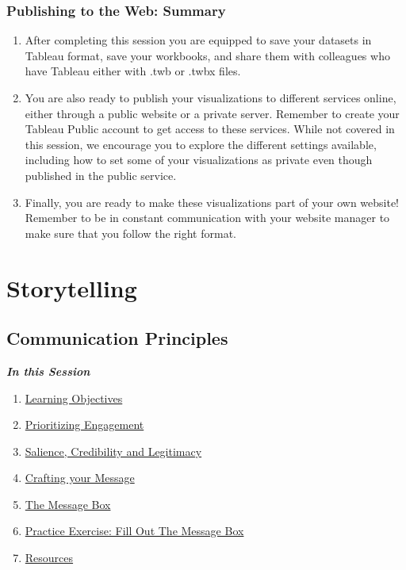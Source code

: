 \documentclass[
]{book}
\providecommand{\tightlist}{%
  \setlength{\itemsep}{0pt}\setlength{\parskip}{0pt}}
\begin{document}
\hypertarget{publishing-to-the-web-summary}{%
\subsection{Publishing to the Web: Summary}\label{publishing-to-the-web-summary}}

\begin{enumerate}
\def\labelenumi{\arabic{enumi}.}
\tightlist
\item
  After completing this session you are equipped to save your datasets in Tableau format, save your workbooks, and share them with colleagues who have Tableau either with .twb or .twbx files.
\item
  You are also ready to publish your visualizations to different services online, either through a public website or a private server. Remember to create your Tableau Public account to get access to these services. While not covered in this session, we encourage you to explore the different settings available, including how to set some of your visualizations as private even though published in the public service.
\item
  Finally, you are ready to make these visualizations part of your own website! Remember to be in constant communication with your website manager to make sure that you follow the right format.
\end{enumerate}

\hypertarget{storytelling}{%
\chapter{Storytelling}\label{storytelling}}

\hypertarget{communication-principles}{%
\section{Communication Principles}\label{communication-principles}}

\textbf{\emph{In this Session}}

\begin{enumerate}
\def\labelenumi{\arabic{enumi}.}
\tightlist
\item
  \protect\hyperlink{communication-learning-objectives}{Learning Objectives}
\item
  \protect\hyperlink{prioritizing-engagement}{Prioritizing Engagement}
\item
  \protect\hyperlink{salience-credibility-and-legitimacy-cornerstones-of-effective-communication}{Salience, Credibility and Legitimacy}
\item
  \protect\hyperlink{crafting-your-message}{Crafting your Message}
\item
  \protect\hyperlink{the-message-box}{The Message Box}
\item
  \protect\hyperlink{practice-exercise-fill-out-the-message-box}{Practice Exercise: Fill Out The Message Box}
\item
  \protect\hyperlink{communication-resources}{Resources}
\end{enumerate}
\end{document}
